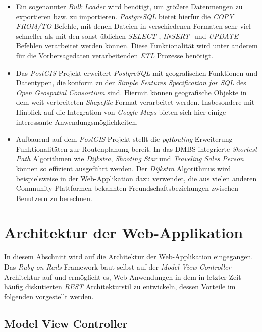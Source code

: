 \begin{itemize}
\item Ein sogenannter \textit{Bulk Loader} wird benötigt, um größere
  Datenmengen zu exportieren bzw. zu importieren. \textit{PostgreSQL}
  bietet hierfür die \textit{COPY FROM/TO}-Befehle, mit denen Dateien
  in verschiedenen Formaten sehr viel schneller als mit den sonst
  üblichen \textit{SELECT-}, \textit{INSERT-} und
  \textit{UPDATE-}Befehlen verarbeitet werden können. Diese
  Funktionalität wird unter anderem für die Vorhersagedaten
  verarbeitenden \textit{ETL} Prozesse benötigt.

\item Das \textit{PostGIS-}Projekt erweitert \textit{PostgreSQL} mit
  geografischen Funktionen und Datentypen, die konform zu der
  \textit{Simple Features Specification for SQL} des \textit{Open
    Geospatial Consortium} sind. Hiermit können geografische Objekte
  in dem weit verbreiteten \textit{Shapefile} Format verarbeitet
  werden. Insbesondere mit Hinblick auf die Integration von
  \textit{Google Maps} bieten sich hier einige interessante
  Anwendungsmöglichkeiten.

\item Aufbauend auf dem \textit{PostGIS} Projekt stellt die
  \textit{pgRouting} Erweiterung Funktionalitäten zur Routenplanung
  bereit. In das DMBS integrierte \textit{Shortest Path} Algorithmen
  wie \textit{Dijkstra}, \textit{Shooting Star} und \textit{Traveling
    Sales Person} können so effizient ausgeführt werden. Der
  \textit{Dijkstra} Algorithmus wird beispielsweise in der
  Web-Applikation dazu verwendet, die aus vielen anderen
  Community-Plattformen bekannten Freundschaftsbeziehungen zwischen
  Benutzern zu berechnen.

\end{itemize}

\section{Architektur der Web-Applikation}
In diesem Abschnitt wird auf die Architektur der Web-Applikation
eingegangen. Das \textit{Ruby on Rails} Framework baut selbst auf der
\textit{Model View Controller} Architektur auf und ermöglicht es, Web
Anwendungen in dem in letzter Zeit häufig diskutierten \textit{REST}
Architekturstil zu entwickeln, dessen Vorteile im folgenden
vorgestellt werden.

\subsection{Model View Controller}
\label{Model View Controller}

